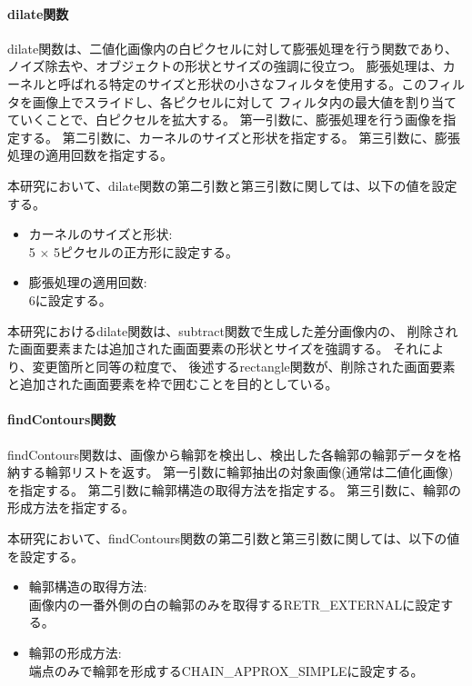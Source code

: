 \paragraph{dilate関数}
dilate関数は、二値化画像内の白ピクセルに対して膨張処理を行う関数であり、ノイズ除去や、オブジェクトの形状とサイズの強調に役立つ。
膨張処理は、カーネルと呼ばれる特定のサイズと形状の小さなフィルタを使用する。このフィルタを画像上でスライドし、各ピクセルに対して
フィルタ内の最大値を割り当てていくことで、白ピクセルを拡大する。
第一引数に、膨張処理を行う画像を指定する。
第二引数に、カーネルのサイズと形状を指定する。
第三引数に、膨張処理の適用回数を指定する。
\par
本研究において、dilate関数の第二引数と第三引数に関しては、以下の値を設定する。
\begin{itemize}
      \setlength{\itemsep}{0pt}
            \setlength{\parsep}{0pt}
      \item カーネルのサイズと形状:\\
            5 $\times$ 5ピクセルの正方形に設定する。
      \item 膨張処理の適用回数:\\
            $6$に設定する。
\end{itemize}
\par
本研究におけるdilate関数は、subtract関数で生成した差分画像内の、
削除された画面要素または追加された画面要素の形状とサイズを強調する。
それにより、変更箇所と同等の粒度で、
後述するrectangle関数が、削除された画面要素と追加された画面要素を枠で囲むことを目的としている。
\paragraph{findContours関数}
findContours関数は、画像から輪郭を検出し、検出した各輪郭の輪郭データを格納する輪郭リストを返す。
第一引数に輪郭抽出の対象画像(通常は二値化画像)を指定する。
第二引数に輪郭構造の取得方法を指定する。
第三引数に、輪郭の形成方法を指定する。
\par
本研究において、findContours関数の第二引数と第三引数に関しては、以下の値を設定する。
\begin{itemize}
      \setlength{\itemsep}{0pt}
            \setlength{\parsep}{0pt}
      \item 輪郭構造の取得方法:\\
            画像内の一番外側の白の輪郭のみを取得するRETR\_EXTERNAL\cite{RetrExternal}に設定する。
      \item 輪郭の形成方法:\\
            端点のみで輪郭を形成するCHAIN\_APPROX\_SIMPLE\cite{ChainApproxSimple}に設定する。
\end{itemize}
\par
